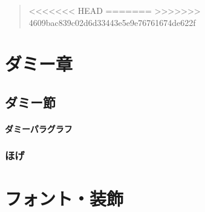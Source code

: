 \documentclass[11pt,a4paper, titlepage]{ltjsarticle}
\let\origsection\section
\let\origsubsection\subsection
\newcommand{\chapter}{\origsection}
\renewcommand{\section}{\origsubsection}
\renewcommand{\subsection}{\subsubsection}
\newcommand{\記}{\begin{center} 記 \end{center}}
\newcommand{\挨拶}{\noindent 拝啓 \ifcase\month\or 厳寒\or 春寒\or 早春
    \or 陽寒\or 新緑\or 向暑\or 猛暑\or 残暑\or 初秋\or 仲秋\or 晩秋\or 初冬
    \fi の候, ますますご清栄のこととお喜び申し上げます.}
\begin{document}
\begin{abstract}
    <<<<<<< HEAD
    \lipsum[1-2]
    =======
    \lipsum[1-10]
    >>>>>>> 4609bac839c02d6d33443e5e9e76761674de622f
\end{abstract}

\tableofcontents
\newpage
\listoffigures
\newpage
\listoftables
\newpage
\makeatletter
{}
\makeatother
\chapter{ダミー章}
\lipsum[1-5]
\section{ダミー節 \label{sec:1}}
\lipsum[6-20]
\lipsum[21-25]
\paragraph{ダミーパラグラフ}
\lipsum[20]
\subsection{ほげ}

\chapter{フォント・装飾}
\end{document}
